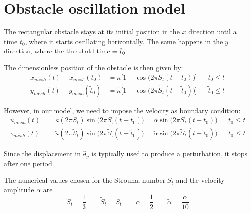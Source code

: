 \documentclass[11 pt]{article}
\begin{document}
\section{Obstacle oscillation model}
The rectangular obstacle stays at its initial position in the $x$ direction until a time $t_0$, where it starts oscillating horizontally. The same happens in the $y$ direction, where the threshold time $=\Tilde{t}_0$.

The dimensionless position of the obstacle is then given by:
\begin{equation}
\begin{aligned}
    x_{mesh}(t) - x_{mesh}(t_0) &= \kappa \Big[1 - \cos{\Big(2\pi S_t (t - t_0)\Big)} \Big] && t_0 \leq t\\
    y_{mesh}(t) - y_{mesh}(\tilde t_0) &= \tilde \kappa \Big[1 - \cos{\Big(2\pi \tilde S_t (t - \tilde t_0)\Big)} \Big] && \tilde t_0 \leq t
\end{aligned}
\end{equation}

However, in our model, we need to impose the velocity as boundary condition:
\begin{equation}
\begin{aligned}
    u_{mesh}(t) &= \kappa (2\pi S_t) \sin{\big(2\pi S_t (t - t_0)\big)} = \alpha \sin{\big(2\pi S_t (t - t_0)\big)} && t_0 \leq t\\
    v_{mesh}(t) &= \tilde \kappa (2\pi \tilde S_t ) \sin{\big(2\pi \tilde S_t (t - \tilde t_0)\big)} = \tilde \alpha \sin{\big(2\pi \tilde S_t (t - \tilde t_0)\big)} && \tilde t_0 \leq t
\end{aligned}
\end{equation}

Since the displacement in $\mathbf{\hat e}_y$ is typically used to produce a perturbation, it stops after one period. 

The numerical values chosen for the Strouhal number $S_t$ and the velocity amplitude $\alpha$ are
\begin{equation}
    S_t = \frac{1}{3} \qquad \tilde S_t = S_t \qquad \alpha = \frac{1}{2} \qquad \tilde \alpha = \frac{\alpha}{10}
\end{equation}
\end{document}
